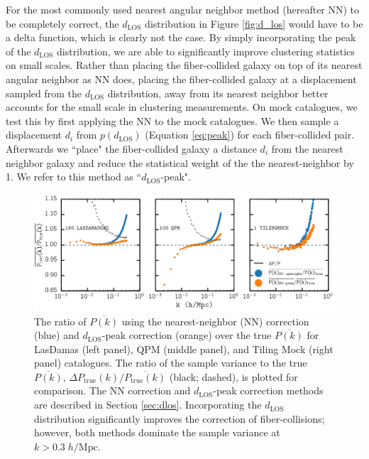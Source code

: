 \documentclass{emulateapj}
\begin{document}
For the most commonly used nearest angular neighbor method (hereafter NN) to be completely correct, the $d_{\mathrm{LOS}}$ distribution in Figure \ref{fig:d_los} would have to be a delta function, which is clearly not the case. By simply incorporating the peak of the $d_{\mathrm{LOS}}$ distribution, we are able to significantly improve clustering statistics on small scales. Rather than placing the fiber-collided galaxy on top of its nearest angular neighbor as NN does, placing the fiber-collided galaxy at a displacement sampled from the $d_{\mathrm{LOS}}$ distribution, away from its nearest neighbor better accounts for the small scale in clustering measurements. On mock catalogues, we test this by first applying the NN to the mock catalogues. We then sample a displacement $d_i$ from $p(d_\mathrm{LOS})$ (Equation \ref{eq:peak}) for each fiber-collided pair. Afterwards we ``place" the fiber-collided galaxy a distance $d_i$ from the nearest neighbor galaxy and reduce the statistical weight of the the nearest-neighbor by 1. We refer to this method as ``$d_\mathrm{LOS}$-peak". 

\begin{figure}
\begin{center}
\includegraphics[scale=0.55]{fcpaper_pk_peakonly_comp.png} 
\caption{The ratio of $\overline{P(k)}$ using the nearest-neighbor (NN) correction (blue) and $d_\mathrm{LOS}$-peak correction (orange) over the true $\overline{P(k)}$ for LasDamas (left panel), QPM (middle panel), and Tiling Mock (right panel) catalogues. The ratio of the sample variance to the true $\overline{P(k)}$, $\Delta P_\mathrm{true}(k) / \overline{P_\mathrm{true}(k)}$ (black; dashed), is plotted for comparison. The NN correction and $d_\mathrm{LOS}$-peak correction methods are described in Section \ref{sec:dlos}. Incorporating the $d_{\mathrm{LOS}}$ distribution significantly improves the correction of fiber-collisions; however, both methods dominate the sample variance at $k > 0.3 \; h/\mathrm{Mpc}$.}\label{fig:peakonly}
\end{center}
\end{figure}
\end{document}
